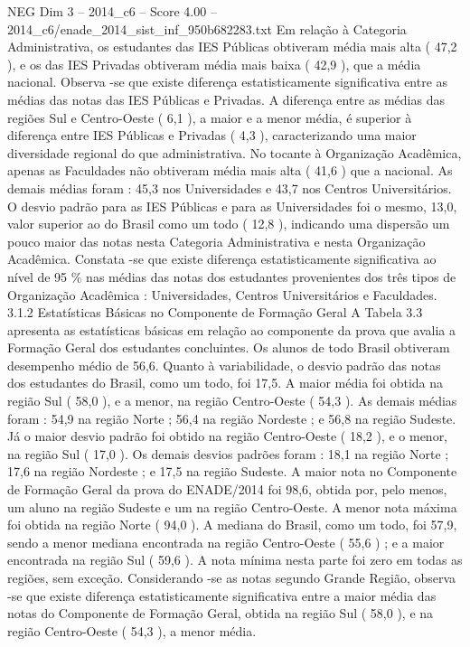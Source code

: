 \begin{textsample}{NEG Dim 3 – 2014\_c6 – Score 4.00 – 2014\_c6/enade\_2014\_sist\_inf\_950b682283.txt}
Em relação à Categoria Administrativa, os estudantes das IES Públicas obtiveram média mais alta ( 47,2 ), e os das IES Privadas obtiveram média mais baixa ( 42,9 ), que a média nacional.
Observa -se que existe diferença estatisticamente significativa entre as médias das notas das IES Públicas e Privadas.
A diferença entre as médias das regiões Sul e Centro-Oeste ( 6,1 ), a maior e a menor média, é superior à diferença entre IES Públicas e Privadas ( 4,3 ), caracterizando uma maior diversidade regional do que administrativa.
No tocante à Organização Acadêmica, apenas as Faculdades não obtiveram média mais alta ( 41,6 ) que a nacional.
As demais médias foram : 45,3 nos Universidades e 43,7 nos Centros Universitários.
O desvio padrão para as IES Públicas e para as Universidades foi o mesmo, 13,0, valor superior ao do Brasil como um todo ( 12,8 ), indicando uma dispersão um pouco maior das notas nesta Categoria Administrativa e nesta Organização Acadêmica.
Constata -se que existe diferença estatisticamente significativa ao nível de 95 \% nas médias das notas dos estudantes provenientes dos três tipos de Organização Acadêmica : Universidades, Centros Universitários e Faculdades. 3.1.2 Estatísticas Básicas no Componente de Formação Geral A Tabela 3.3 apresenta as estatísticas básicas em relação ao componente da prova que avalia a Formação Geral dos estudantes concluintes.
Os alunos de todo Brasil obtiveram desempenho médio de 56,6.
Quanto à variabilidade, o desvio padrão das notas dos estudantes do Brasil, como um todo, foi 17,5.
A maior média foi obtida na região Sul ( 58,0 ), e a menor, na região Centro-Oeste ( 54,3 ).
As demais médias foram : 54,9 na região Norte ; 56,4 na região Nordeste ; e 56,8 na região Sudeste.
Já o maior desvio padrão foi obtido na região Centro-Oeste ( 18,2 ), e o menor, na região Sul ( 17,0 ).
Os demais desvios padrões foram : 18,1 na região Norte ; 17,6 na região Nordeste ; e 17,5 na região Sudeste.
A maior nota no Componente de Formação Geral da prova do ENADE/2014 foi 98,6, obtida por, pelo menos, um aluno na região Sudeste e um na região Centro-Oeste.
A menor nota máxima foi obtida na região Norte ( 94,0 ).
A mediana do Brasil, como um todo, foi 57,9, sendo a menor mediana encontrada na região Centro-Oeste ( 55,6 ) ; e a maior encontrada na região Sul ( 59,6 ).
A nota mínima nesta parte foi zero em todas as regiões, sem exceção.
Considerando -se as notas segundo Grande Região, observa -se que existe diferença estatisticamente significativa entre a maior média das notas do Componente de Formação Geral, obtida na região Sul ( 58,0 ), e na região Centro-Oeste ( 54,3 ), a menor média.

\end{textsample}
